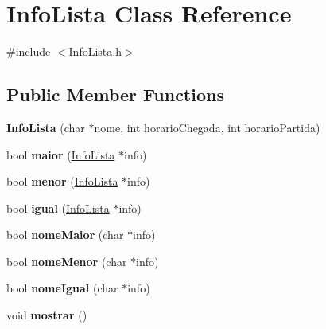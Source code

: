 \hypertarget{classInfoLista}{\section{\-Info\-Lista \-Class \-Reference}
\label{classInfoLista}
}


{\ttfamily \#include $<$\-Info\-Lista.\-h$>$}

\subsection*{\-Public \-Member \-Functions}
\begin{DoxyCompactItemize}
\item 
\hypertarget{classInfoLista_a532908ee307b7749a7b5d10fe85ae015}{{\bfseries \-Info\-Lista} (char $\ast$nome, int horario\-Chegada, int horario\-Partida)}\label{classInfoLista_a532908ee307b7749a7b5d10fe85ae015}

\item 
\hypertarget{classInfoLista_a0afc64956da02f4df53da41d0be37c02}{bool {\bfseries maior} (\hyperlink{classInfoLista}{\-Info\-Lista} $\ast$info)}\label{classInfoLista_a0afc64956da02f4df53da41d0be37c02}

\item 
\hypertarget{classInfoLista_af99b88d8f5a125273f6827fcc04aa441}{bool {\bfseries menor} (\hyperlink{classInfoLista}{\-Info\-Lista} $\ast$info)}\label{classInfoLista_af99b88d8f5a125273f6827fcc04aa441}

\item 
\hypertarget{classInfoLista_ae9ea9eb4ec0c64bf59bade1093c9c04c}{bool {\bfseries igual} (\hyperlink{classInfoLista}{\-Info\-Lista} $\ast$info)}\label{classInfoLista_ae9ea9eb4ec0c64bf59bade1093c9c04c}

\item 
\hypertarget{classInfoLista_a0d99bba395958ad32b3a1cc957e9fac7}{bool {\bfseries nome\-Maior} (char $\ast$info)}\label{classInfoLista_a0d99bba395958ad32b3a1cc957e9fac7}

\item 
\hypertarget{classInfoLista_a551a5295f6e09e38ebb8243215b88bda}{bool {\bfseries nome\-Menor} (char $\ast$info)}\label{classInfoLista_a551a5295f6e09e38ebb8243215b88bda}

\item 
\hypertarget{classInfoLista_a12062abc2815d2af8c6957ef660e0bce}{bool {\bfseries nome\-Igual} (char $\ast$info)}\label{classInfoLista_a12062abc2815d2af8c6957ef660e0bce}

\item 
\hypertarget{classInfoLista_a818f2420b2b316d18e11ba435eb705d7}{void {\bfseries mostrar} ()}\label{classInfoLista_a818f2420b2b316d18e11ba435eb705d7}

\end{DoxyCompactItemize}
